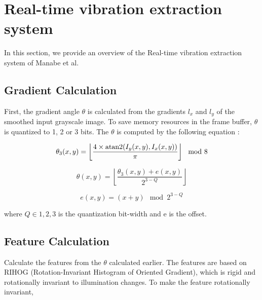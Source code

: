 \section{Real-time vibration extraction system}\label{section:system}

In this section, we provide an overview of the Real-time vibration extraction system of Manabe et al.

\subsection{Gradient Calculation}\label{subsection:gradient}

First, the gradient angle $\theta$ is calculated from the gradients $l_x$ and $l_y$
of the smoothed input grayscale image. To save memory resources in the frame buffer,
$\theta$ is quantized to 1, 2 or 3 bits. The $\theta$ is computed by the following equation :


\begin{equation}
  \label{equ:grad_angle1}
  \theta_3(x,y) = \left\lfloor \frac{4 \times {\rm atan2}(I_y(x,y),I_x(x,y))}{\pi} \right\rfloor\mod 8
\end{equation}

\begin{equation}
  \label{equ:grad_angle2}
  \theta(x,y) = \left\lfloor \frac{\theta_3(x,y) + e(x,y)}{2^{3-Q}} \right\rfloor
\end{equation}

\begin{equation}
  \label{equ:grad_angle3}
  e(x,y) = (x+y)\mod 2^{3-Q}
  \end{equation}

where $Q\in{1,2,3}$ is the quantization bit-width and e is the offset.



\subsection{Feature Calculation}\label{subsection:feature}

Calculate the features from the $\theta$ calculated earlier.
The features are based on RIHOG (Rotation-Invariant Histogram of Oriented Gradient),
which is rigid and rotationally invariant to illumination changes.
To make the feature rotationally invariant,

